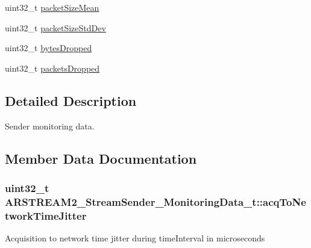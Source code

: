\begin{DoxyCompactItemize}
\item 
uint32\+\_\+t \hyperlink{struct_a_r_s_t_r_e_a_m2___stream_sender___monitoring_data__t_a427b8c2db7d802dc6ccdca41a4ac8069}{packet\+Size\+Mean}
\item 
uint32\+\_\+t \hyperlink{struct_a_r_s_t_r_e_a_m2___stream_sender___monitoring_data__t_ab1568fe6aabadbc546ee569cb1891747}{packet\+Size\+Std\+Dev}
\item 
uint32\+\_\+t \hyperlink{struct_a_r_s_t_r_e_a_m2___stream_sender___monitoring_data__t_a2ba61048e4767b788dd6b1c7254438ad}{bytes\+Dropped}
\item 
uint32\+\_\+t \hyperlink{struct_a_r_s_t_r_e_a_m2___stream_sender___monitoring_data__t_ab529e15636d3e0e84e642c544c7f1170}{packets\+Dropped}
\end{DoxyCompactItemize}


\subsection{Detailed Description}
Sender monitoring data. 

\subsection{Member Data Documentation}
\subsubsection[{\texorpdfstring{acq\+To\+Network\+Time\+Jitter}{acqToNetworkTimeJitter}}]{\setlength{\rightskip}{0pt plus 5cm}uint32\+\_\+t A\+R\+S\+T\+R\+E\+A\+M2\+\_\+\+Stream\+Sender\+\_\+\+Monitoring\+Data\+\_\+t\+::acq\+To\+Network\+Time\+Jitter}\hypertarget{struct_a_r_s_t_r_e_a_m2___stream_sender___monitoring_data__t_a0f162472ca1c2d5563888c3ed5c7ffc2}{}\label{struct_a_r_s_t_r_e_a_m2___stream_sender___monitoring_data__t_a0f162472ca1c2d5563888c3ed5c7ffc2}
Acquisition to network time jitter during time\+Interval in microseconds 
